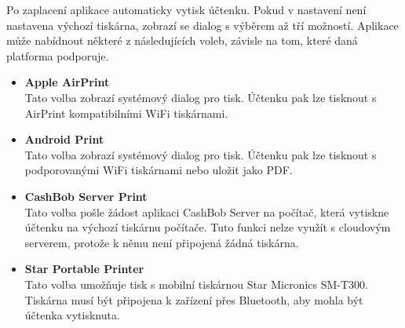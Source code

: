 Po zaplacení aplikace automaticky vytisk účtenku.
Pokud v nastavení není nastavena výchozí tiskárna, zobrazí se dialog s výběrem až tří možností.
Aplikace může nabídnout některé z následujících voleb, závisle na tom, které daná platforma podporuje.

\begin{itemize}

\item \textbf{Apple AirPrint}\\
    Tato volba zobrazí systémový dialog pro tisk.
    Účtenku pak lze tisknout s AirPrint kompatibilními WiFi tiskárnami.
\item \textbf{Android Print}\\
    Tato volba zobrazí systémový dialog pro tisk.
    Účtenku pak lze tisknout s podporovanými WiFi tiskárnami nebo uložit jako PDF.
\item \textbf{CashBob Server Print}\\
    Tato volba pošle žádost aplikaci CashBob Server na počítač, která vytiskne účtenku na výchozí tiskárnu počítače.
    Tuto funkci nelze využít s cloudovým serverem, protože k němu není připojená žádná tiskárna.
\item \textbf{Star Portable Printer}\\
    Tato volba umožňuje tisk s mobilní tiskárnou Star Micronics SM-T300.
    Tiskárna musí být připojena k zařízení přes Bluetooth, aby mohla být účtenka vytisknuta.
\end{itemize}

